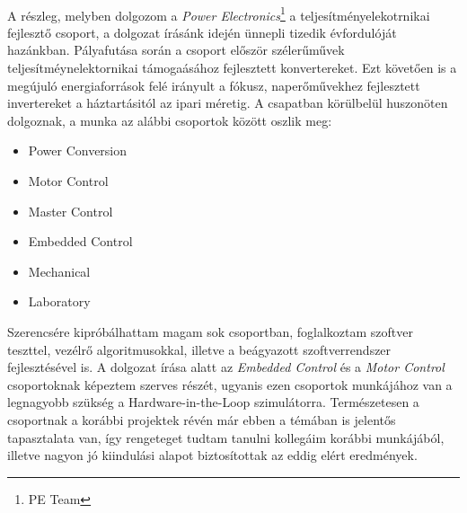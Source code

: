 \paragraph{}
A részleg, melyben dolgozom a \emph{Power Electronics}\footnote{PE Team} a teljesítményelekotrnikai fejlesztő csoport, a dolgozat írásánk idején ünnepli tizedik évfordulóját hazánkban. Pályafutása során a csoport először szélerűművek teljesítméynelektornikai támogaásához fejlesztett konvertereket. Ezt követően is a megújuló energiaforrások felé irányult a fókusz, naperőművekhez fejlesztett invertereket a háztartásitól az ipari méretig. A csapatban körülbelül huszonöten dolgoznak, a munka az alábbi csoportok között oszlik meg:

\begin{itemize}
	\item{Power Conversion}
	\item{Motor Control}
	\item{Master Control}
	\item{Embedded Control}
	\item{Mechanical}
	\item{Laboratory} 
\end{itemize}

Szerencsére kipróbálhattam magam sok csoportban, foglalkoztam szoftver teszttel, vezélrő algoritmusokkal, illetve a beágyazott szoftverrendszer fejlesztésével is. A dolgozat írása alatt az \emph{Embedded Control} és a \emph{Motor Control} csoportoknak képeztem szerves részét, ugyanis ezen csoportok munkájához van a legnagyobb szükség a Hardware-in-the-Loop szimulátorra. Természetesen a csoportnak a korábbi projektek révén már ebben a témában is jelentős tapasztalata van, így rengeteget tudtam tanulni kollegáim korábbi munkájából, illetve nagyon jó kiindulási alapot biztosítottak az eddig elért eredmények.



